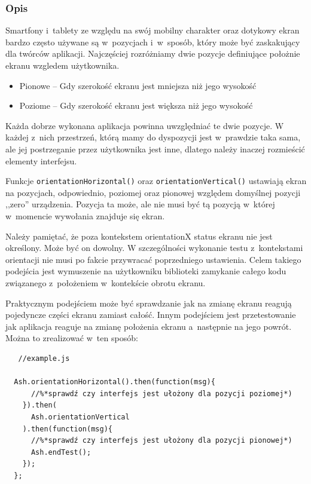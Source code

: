 \documentclass[brudnopis]{xmgr}
\begin{document}
\subsubsection{Opis}

Smartfony i~tablety ze względu na swój mobilny charakter oraz dotykowy ekran bardzo często używane są w~pozycjach i~w~sposób, który może być zaskakujący dla twórców aplikacji. Najczęściej rozróżniamy dwie pozycje definiujące położnie ekranu wzgledem użytkownika. 

\begin{itemize}
  \item Pionowe -- Gdy szerokość ekranu jest mniejsza niż jego wysokość
  \item Poziome -- Gdy szerokość ekranu jest większa niż jego wysokość
\end{itemize}

Każda dobrze wykonana aplikacja powinna uwzględniać te dwie pozycje. W każdej z~nich przestrzeń, którą mamy do dyspozycji jest w~prawdzie taka sama, ale jej postrzeganie przez użytkownika jest inne, dlatego należy inaczej rozmieścić elementy interfejsu.  

Funkcje \texttt{orientationHorizontal()} oraz \texttt{orientationVertical()} ustawiają ekran na pozycjach, odpowiednio, poziomej oraz pionowej względem domyślnej pozycji ,,zero'' urządzenia. Pozycja ta może, ale nie musi być tą pozycją w~której w~momencie wywołania znajduje się ekran.  

Należy pamiętać, że poza kontekstem orientationX status ekranu nie jest określony. Może być on dowolny. W szczególności wykonanie testu z~kontekstami orientacji nie musi po fakcie przywracać poprzedniego ustawienia. Celem takiego podejścia jest wymuszenie na użytkowniku biblioteki zamykanie całego kodu związanego z~położeniem w~kontekście obrotu ekranu. 

Praktycznym podejściem może być sprawdzanie jak na zmianę ekranu reagują pojedyncze części ekranu zamiast całość. Innym podejściem jest przetestowanie jak aplikacja reaguje na zmianę położenia ekranu a~następnie na jego powrót. Można to zrealizować w~ten sposób:

\begin{lstlisting}
   //example.js

  Ash.orientationHorizontal().then(function(msg){
      //%*sprawdź czy interfejs jest ułożony dla pozycji poziomej*)
    }).then(
      Ash.orientationVertical
    ).then(function(msg){
      //%*sprawdź czy interfejs jest ułożony dla pozycji pionowej*)
      Ash.endTest();
    });
  };
\end{lstlisting}
\end{document}
